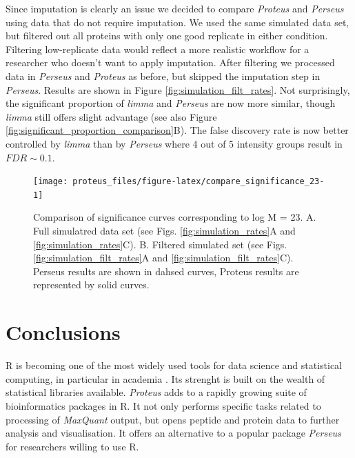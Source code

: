 \documentclass[]{article}
\begin{document}
Since imputation is clearly an issue we decided to compare
\emph{Proteus} and \emph{Perseus} using data that do not require
imputation. We used the same simulated data set, but filtered out all
proteins with only one good replicate in either condition. Filtering
low-replicate data would reflect a more realistic workflow for a
researcher who doesn't want to apply imputation. After filtering we
processed data in \emph{Perseus} and \emph{Proteus} as before, but
skipped the imputation step in \emph{Perseus}. Results are shown in
Figure \ref{fig:simulation_filt_rates}. Not surprisingly, the
significant proportion of \emph{limma} and \emph{Perseus} are now more
similar, though \emph{limma} still offers slight advantage (see also
Figure \ref{fig:significant_proportion_comparison}B). The false
discovery rate is now better controlled by \emph{limma} than by
\emph{Perseus} where 4 out of 5 intensity groups result in
\(FDR \sim 0.1\).

\begin{figure}[H]

{\centering \texttt{[image: proteus\_files/figure-latex/compare\_significance\_23-1]} 

}

\caption{\label{fig:significant_proportion_comparison}Comparison of significance curves corresponding to log M = 23. A. Full simulatred data set (see Figs. \ref{fig:simulation_rates}A and  \ref{fig:simulation_rates}C). B. Filtered simulated set (see Figs. \ref{fig:simulation_filt_rates}A and \ref{fig:simulation_filt_rates}C). Perseus results are shown in dahsed curves, Proteus results are represented by solid curves.}\label{fig:compare_significance_23}
\end{figure}

\section{Conclusions}\label{conclusions}

R is becoming one of the most widely used tools for data science and
statistical computing, in particular in academia
\citep{tippmann2014, muenchen2017}. Its strenght is built on the wealth
of statistical libraries available. \emph{Proteus} adds to a rapidly
growing suite of bioinformatics packages in R. It not only performs
specific tasks related to processing of \emph{MaxQuant} output, but
opens peptide and protein data to further analysis and visualisation. It
offers an alternative to a popular package \emph{Perseus} for
researchers willing to use R.
\end{document}
